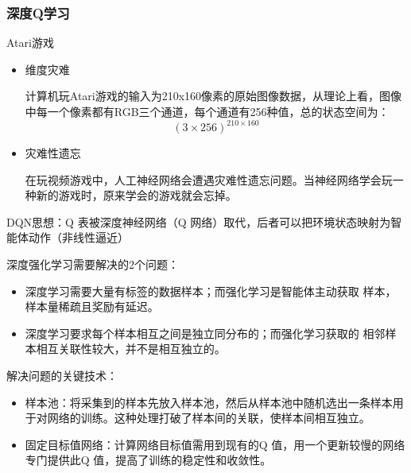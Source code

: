 \subsubsection{深度Q学习}
\begin{note}
    Atari游戏
    \begin{itemize}
        \item 维度灾难
        
        计算机玩Atari游戏的输入为210x160像素的原始图像数据，从理论上看，图像中每一个像素都有RGB三个通道，每个通道有256种值，总的状态空间为：
        \[
            (3\times 256)^{210\times 160}
        \]
        \item 灾难性遗忘
        
        在玩视频游戏中，人工神经网络会遭遇灾难性遗忘问题。当神经网络学会玩一种新的游戏时，原来学会的游戏就会忘掉。
    \end{itemize}
\end{note}
\begin{definition}[DQN]
    DQN思想：Q 表被深度神经网络（Q 网络）取代，后者可以把环境状态映射为智能体动作（非线性逼近）
\end{definition}
\begin{note}
    深度强化学习需要解决的2个问题：
    \begin{itemize}
        \item 深度学习需要大量有标签的数据样本；而强化学习是智能体主动获取
        样本，样本量稀疏且奖励有延迟。
        \item 深度学习要求每个样本相互之间是独立同分布的；而强化学习获取的
        相邻样本相互关联性较大，并不是相互独立的。
    \end{itemize}
\end{note}
\begin{note}
    解决问题的关键技术：
    \begin{itemize}
        \item 样本池：将采集到的样本先放入样本池，然后从样本池中随机选出一条样本用于对网络的训练。这种处理打破了样本间的关联，使样本间相互独立。
        \item 固定目标值网络：计算网络目标值需用到现有的Q 值，用一个更新较慢的网络专门提供此Q 值，提高了训练的稳定性和收敛性。
    \end{itemize}
\end{note}
